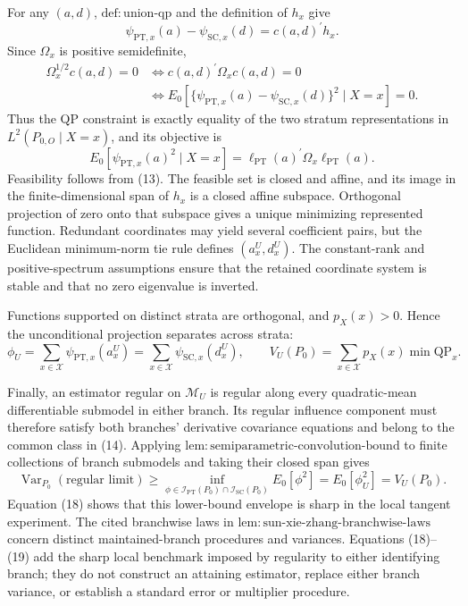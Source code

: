 For any \((a,d)\), \(\mathrm{def{:}union\text{-}qp}\) and the definition of \(h_x\) give
\[
 \psi_{\mathrm{PT},x}(a)-\psi_{\mathrm{SC},x}(d)=c(a,d)^{\prime}h_x.
 \tag{15}
\]
Since \(\Omega_x\) is positive semidefinite,
\[
 \begin{aligned}
 \Omega_x^{1/2}c(a,d)=0
 &\Longleftrightarrow c(a,d)^{\prime}\Omega_xc(a,d)=0\\
 &\Longleftrightarrow
 E_0[\{\psi_{\mathrm{PT},x}(a)-\psi_{\mathrm{SC},x}(d)\}^2\mid X=x]=0.
 \end{aligned}
 \tag{16}
\]
Thus the QP constraint is exactly equality of the two stratum representations in \(L^2(P_{0,O}\mid X=x)\), and its objective is
\[
 E_0[\psi_{\mathrm{PT},x}(a)^2\mid X=x]
 =\ell_{\mathrm{PT}}(a)^{\prime}\Omega_x\ell_{\mathrm{PT}}(a).
 \tag{17}
\]
Feasibility follows from (13). The feasible set is closed and affine, and its image in the finite-dimensional span of \(h_x\) is a closed affine subspace. Orthogonal projection of zero onto that subspace gives a unique minimizing represented function. Redundant coordinates may yield several coefficient pairs, but the Euclidean minimum-norm tie rule defines \((a_x^U,d_x^U)\). The constant-rank and positive-spectrum assumptions ensure that the retained coordinate system is stable and that no zero eigenvalue is inverted.

Functions supported on distinct strata are orthogonal, and \(p_X(x)>0\). Hence the unconditional projection separates across strata:
\[
 \phi_U
 =\sum_{x\in\mathcal X}\psi_{\mathrm{PT},x}(a_x^U)
 =\sum_{x\in\mathcal X}\psi_{\mathrm{SC},x}(d_x^U),
 \qquad
 V_U(P_0)=\sum_{x\in\mathcal X}p_X(x)\min\mathrm{QP}_x.
 \tag{18}
\]

Finally, an estimator regular on \(\mathcal M_U\) is regular along every quadratic-mean differentiable submodel in either branch. Its regular influence component must therefore satisfy both branches' derivative covariance equations and belong to the common class in (14). Applying \(\mathrm{lem{:}semiparametric\text{-}convolution\text{-}bound}\) to finite collections of branch submodels and taking their closed span gives
\[
 \operatorname{Var}_{P_0}(\text{regular limit})
 \ge\inf_{\phi\in\mathcal I_{\mathrm{PT}}(P_0)\cap\mathcal I_{\mathrm{SC}}(P_0)}E_0[\phi^2]
 =E_0[\phi_U^2]=V_U(P_0).
 \tag{19}
\]
Equation (18) shows that this lower-bound envelope is sharp in the local tangent experiment. The cited branchwise laws in \(\mathrm{lem{:}sun\text{-}xie\text{-}zhang\text{-}branchwise\text{-}laws}\) concern distinct maintained-branch procedures and variances. Equations (18)--(19) add the sharp local benchmark imposed by regularity to either identifying branch; they do not construct an attaining estimator, replace either branch variance, or establish a standard error or multiplier procedure.

